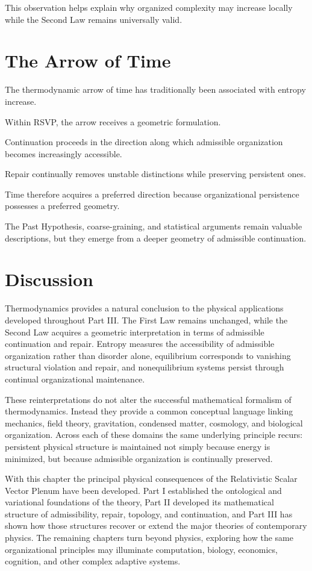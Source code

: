 \documentclass[11pt,oneside]{book}
\numberwithin{equation}{chapter}
\theoremstyle{definition}
\theoremstyle{plain}
\begin{document}
This observation helps explain why organized complexity may increase
locally while the Second Law remains universally valid.

\section{The Arrow of Time}

The thermodynamic arrow of time has traditionally been associated with
entropy increase.

Within RSVP, the arrow receives a geometric formulation.

Continuation proceeds in the direction along which admissible organization
becomes increasingly accessible.

Repair continually removes unstable distinctions while preserving persistent
ones.

Time therefore acquires a preferred direction because organizational
persistence possesses a preferred geometry.

The Past Hypothesis, coarse-graining, and statistical arguments remain
valuable descriptions, but they emerge from a deeper geometry of admissible
continuation.

\section{Discussion}

Thermodynamics provides a natural conclusion to the physical applications
developed throughout Part III. The First Law remains unchanged, while the
Second Law acquires a geometric interpretation in terms of admissible
continuation and repair. Entropy measures the accessibility of admissible
organization rather than disorder alone, equilibrium corresponds to
vanishing structural violation and repair, and nonequilibrium systems
persist through continual organizational maintenance.

These reinterpretations do not alter the successful mathematical formalism
of thermodynamics. Instead they provide a common conceptual language linking
mechanics, field theory, gravitation, condensed matter, cosmology, and
biological organization. Across each of these domains the same underlying
principle recurs: persistent physical structure is maintained not simply
because energy is minimized, but because admissible organization is
continually preserved.

With this chapter the principal physical consequences of the Relativistic
Scalar Vector Plenum have been developed. Part I established the
ontological and variational foundations of the theory, Part II developed
its mathematical structure of admissibility, repair, topology, and
continuation, and Part III has shown how those structures recover or extend
the major theories of contemporary physics. The remaining chapters turn
beyond physics, exploring how the same organizational principles may
illuminate computation, biology, economics, cognition, and other complex
adaptive systems.
\end{document}
